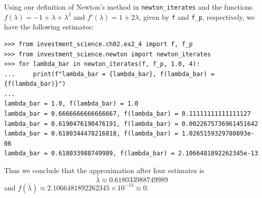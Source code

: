 Using our definition of Newton's method in \verb|newton_iterates| and the
functions $f(\lambda) = -1 + \lambda + \lambda^2$ and
$f'(\lambda) = 1 + 2\lambda$, given by \verb|f| and \verb|f_p|,
respectively, we have the following estimates:
\begin{lstlisting}
>>> from investment_science.ch02.ex2_4 import f, f_p
>>> from investment_science.newton import newton_iterates
>>> for lambda_bar in newton_iterates(f, f_p, 1.0, 4):
...     print(f"lambda_bar = {lambda_bar}, f(lambda_bar) = {f(lambda_bar)}")
...
lambda_bar = 1.0, f(lambda_bar) = 1.0
lambda_bar = 0.6666666666666667, f(lambda_bar) = 0.11111111111111127
lambda_bar = 0.6190476190476191, f(lambda_bar) = 0.0022675736961451642
lambda_bar = 0.6180344478216818, f(lambda_bar) = 1.0265159329780893e-06
lambda_bar = 0.618033988749989, f(lambda_bar) = 2.1066481892262345e-13
\end{lstlisting}
Thus we conclude that the approximation after four estimates is
\[
    \bar{\lambda} \approx 0.618033988749989
\]
and
$f(\bar{\lambda}) \approx 2.1066481892262345 \times {10}^{-13} \approx 0$.

